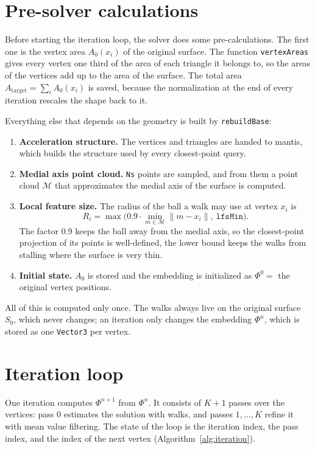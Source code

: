 \documentclass[
]{elteiktdk}[2024/04/26]
\begin{document}
	\section{Pre-solver calculations}
	
	Before starting the iteration loop, the solver does some pre-calculations. The first one is the vertex area $A_0(x_i)$ of the original surface. The function \texttt{vertexAreas} gives every vertex one third of the area of each triangle it belongs to, so the areas of the vertices add up to the area of the surface. The total area $A_{\mathrm{target}} = \sum_i A_0(x_i)$  is saved, because the normalization at the end of every iteration rescales the shape back to it.
	
	Everything else that depends on the geometry is built by \texttt{rebuildBase}:
	\begin{enumerate}
		\item \textbf{Acceleration structure.} The vertices and triangles are handed to mantis, which builds the structure used by every closest-point query.
		\item \textbf{Medial axis point cloud.} \texttt{Ns} points are sampled, and from them a point cloud $\mathcal{M}$ that approximates the medial axis of the surface is computed.
		\item \textbf{Local feature size.} The radius of the ball a walk may use at vertex $x_i$ is
		\[
		R_i = \max\bigl(0.9 \cdot \min_{m \in \mathcal{M}} \lVert m - x_i \rVert,\ \texttt{lfsMin}\bigr).
		\]
		The factor $0.9$ keeps the ball away from the medial axis, so the closest-point projection of its points is well-defined, the lower bound keeps the walks from stalling where the surface is very thin.
		\item \textbf{Initial state.} $A_0$ is stored and the embedding is initialized as $\Phi^0 = $ the original vertex positions.
	\end{enumerate}
	All of this is computed only once. The walks always live on the original surface $S_0$, which never changes; an iteration only changes the embedding $\Phi^n$, which is stored as one \texttt{Vector3} per vertex.
	
	\section{Iteration loop}

	One iteration computes $\Phi^{n+1}$ from $\Phi^{n}$. It consists of $K+1$ passes over the vertices: pass $0$ estimates the solution with walks, and passes $1, \dots, K$ refine it with mean value filtering. The state of the loop is the iteration index, the pass index, and the index of the next vertex (Algorithm~\ref{alg:iteration}).
	
\end{document}
